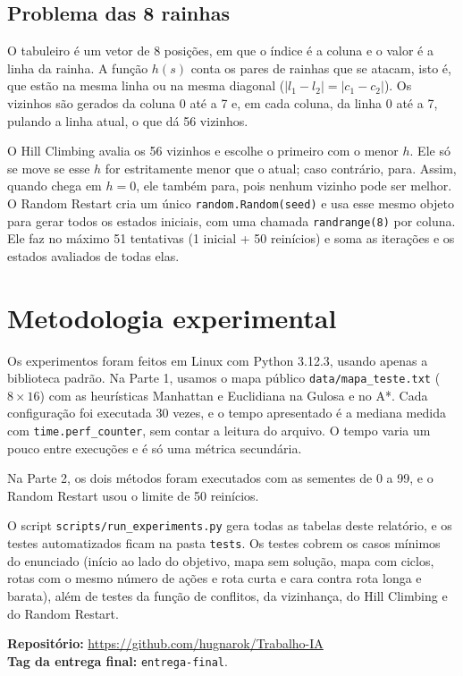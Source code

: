 \documentclass[12pt]{article}
\begin{document}
\subsection{Problema das 8 rainhas}
O tabuleiro é um vetor de 8 posições, em que o índice é a coluna e o valor é a linha da rainha. A função $h(s)$ conta os pares de rainhas que se atacam, isto é, que estão na mesma linha ou na mesma diagonal ($|l_1 - l_2| = |c_1 - c_2|$). Os vizinhos são gerados da coluna 0 até a 7 e, em cada coluna, da linha 0 até a 7, pulando a linha atual, o que dá 56 vizinhos.

O Hill Climbing avalia os 56 vizinhos e escolhe o primeiro com o menor $h$. Ele só se move se esse $h$ for estritamente menor que o atual; caso contrário, para. Assim, quando chega em $h = 0$, ele também para, pois nenhum vizinho pode ser melhor. O Random Restart cria um único \texttt{random.Random(seed)} e usa esse mesmo objeto para gerar todos os estados iniciais, com uma chamada \texttt{randrange(8)} por coluna. Ele faz no máximo 51 tentativas (1 inicial + 50 reinícios) e soma as iterações e os estados avaliados de todas elas.

\section{Metodologia experimental}
Os experimentos foram feitos em Linux com Python 3.12.3, usando apenas a biblioteca padrão. Na Parte 1, usamos o mapa público \texttt{data/mapa\_teste.txt} ($8 \times 16$) com as heurísticas Manhattan e Euclidiana na Gulosa e no A*. Cada configuração foi executada 30 vezes, e o tempo apresentado é a mediana medida com \texttt{time.perf\_counter}, sem contar a leitura do arquivo. O tempo varia um pouco entre execuções e é só uma métrica secundária.

Na Parte 2, os dois métodos foram executados com as sementes de 0 a 99, e o Random Restart usou o limite de 50 reinícios.

O script \texttt{scripts/run\_experiments.py} gera todas as tabelas deste relatório, e os testes automatizados ficam na pasta \texttt{tests}. Os testes cobrem os casos mínimos do enunciado (início ao lado do objetivo, mapa sem solução, mapa com ciclos, rotas com o mesmo número de ações e rota curta e cara contra rota longa e barata), além de testes da função de conflitos, da vizinhança, do Hill Climbing e do Random Restart.

\noindent\textbf{Repositório:} \url{https://github.com/hugnarok/Trabalho-IA} \\
\textbf{Tag da entrega final:} \texttt{entrega-final}.
\end{document}
